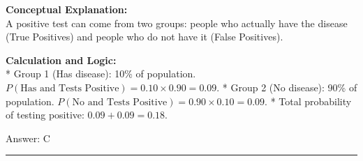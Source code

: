 \documentclass[11pt,paper=a4,answers]{exam}
\begin{document}
\begin{questions}
\begin{solution}
\textbf{Conceptual Explanation:} \\
A positive test can come from two groups: people who actually have the disease (True Positives) and people who do not have it (False Positives).

\vspace{30pt}

\textbf{Calculation and Logic:} \\
* Group 1 (Has disease): 10\% of population. $P(\text{Has and Tests Positive}) = 0.10 \times 0.90 = 0.09$.
* Group 2 (No disease): 90\% of population. $P(\text{No and Tests Positive}) = 0.90 \times 0.10 = 0.09$.
* Total probability of testing positive: $0.09 + 0.09 = 0.18$.

\vspace{30pt}

Answer: \colorbox{yellow!100}{C}
\end{solution}


\end{questions}
\begin{center}
\rule{.5\textwidth}{1pt}
\end{center}
\end{document}
